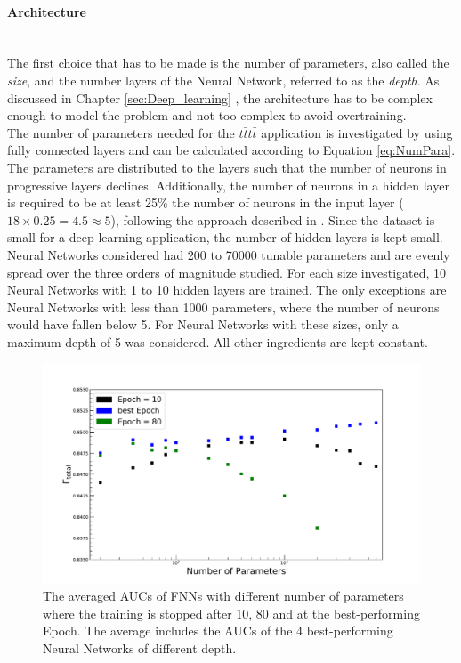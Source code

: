 \paragraph{Architecture} \mbox{} \\

The first choice that has to be made is the number of parameters, also called the \textit{size}, and the number layers of the Neural Network, referred to as the \textit{depth}. As discussed in Chapter \ref{sec:Deep_learning} , the architecture has to be complex enough to model the problem and not too complex to avoid overtraining. \\
The number of parameters needed for the $t\bar{t}t\bar{t}$ application is investigated by using fully connected layers and can be calculated according to Equation \ref{eq:NumPara}. The parameters are distributed to the layers such that the number of neurons in progressive layers declines. Additionally, the number of neurons in a hidden layer is required to be at least 25\% the number of neurons in the input layer ($18 \times 0.25 = 4.5 \approx 5$), following the approach described in \cite{RNNSel}. Since the dataset is small for a deep learning application, the number of hidden layers is kept small. \\
Neural Networks considered had 200 to 70000 tunable parameters and are evenly spread over the three orders of magnitude studied. For each size investigated, 10 Neural Networks with 1 to 10 hidden layers are trained. The only exceptions are Neural Networks with less than 1000 parameters, where the number of neurons would have fallen below 5. For Neural Networks with these sizes, only a maximum depth of 5 was considered. All other ingredients are kept constant. \\


\begin{figure}[H]
\centering
\includegraphics[width=\linewidth]{figs/FNN/AucPara_Fixed}
\caption{The averaged AUCs of FNNs with different number of parameters where the training is stopped after 10, 80 and at the best-performing Epoch. The average includes the AUCs of the 4 best-performing Neural Networks of different depth.}
\label{fig:AucPara}
\end{figure}


